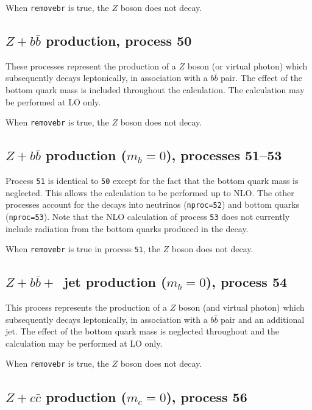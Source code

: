 When {\tt removebr} is true, the $Z$ boson does not decay.

\subsection{$Z+b{\bar b}$ production, process 50}
\label{subsec:zbb}

These processes represent the production of a $Z$ boson (or virtual photon)
which subsequently decays leptonically, in association
with a $b{\bar b}$ pair. The effect of
the bottom quark mass is included throughout the calculation.  
The calculation may be performed at LO only.

When {\tt removebr} is true, the $Z$ boson does not decay.

\subsection{$Z+b{\bar b}$ production ($m_b=0$), processes 51--53}
\label{subsec:zbbmassless}

Process {\tt 51} is identical to {\tt 50} except for the fact
that the bottom quark mass is neglected. This allows the calculation to be
performed up to NLO. The other processes account for the decays into
neutrinos ({\tt nproc=52}) and bottom quarks ({\tt nproc=53}). Note that
the NLO calculation of process {\tt 53} does not currently 
include radiation from the
bottom quarks produced in the decay.

When {\tt removebr} is true in process {\tt 51}, the $Z$ boson does not decay.

\subsection{$Z+b{\bar b}+$~jet production ($m_b=0$), process 54}
\label{subsec:zbbjetmassless}

This process represents the production of a $Z$ boson (and virtual photon)
which subsequently decays leptonically, in association
with a $b{\bar b}$ pair and an additional jet.
The effect of the bottom quark mass is neglected throughout
and the calculation may be performed at LO only.

When {\tt removebr} is true, the $Z$ boson does not decay.

\subsection{$Z+c{\bar c}$ production ($m_c=0$), process 56}
\label{subsec:zccmassless}

